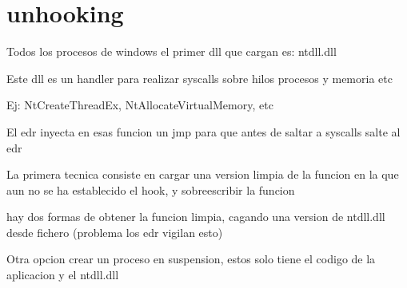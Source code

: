 \chapter{unhooking}

Todos los procesos de windows el primer dll que cargan es: ntdll.dll 

Este dll es un handler para realizar syscalls sobre hilos procesos y memoria etc

Ej: NtCreateThreadEx, NtAllocateVirtualMemory, etc

El edr inyecta en esas funcion un jmp para que antes de saltar a syscalls salte 
al edr

La primera tecnica consiste en cargar una version limpia de la funcion en la que
aun no se ha establecido el hook, y sobreescribir la funcion

hay dos formas de obtener la funcion limpia, cagando una version de ntdll.dll
desde fichero (problema los edr vigilan esto)

Otra opcion crear un proceso en suspension, estos solo tiene el codigo de la
aplicacion y el ntdll.dll
